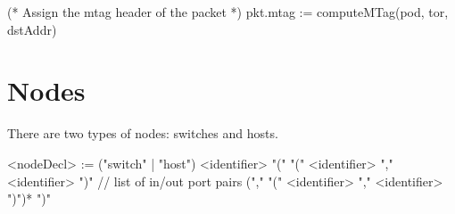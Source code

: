 \documentclass{report}
\begin{document}
\begin{dllisting}{}
(* Assign the mtag header of the packet *)
pkt.mtag := computeMTag(pod, tor, dstAddr)
\end{dllisting}

\section{Nodes}

There are two types of nodes: switches and hosts.  

\begin{bnflisting}{}
<nodeDecl> := ("switch" | "host") <identifier> "(" 
              "(" <identifier> "," <identifier> ")" // list of in/out port pairs
              ("," "(" <identifier> "," <identifier> ")")*
              ")"
\end{bnflisting}
\end{document}
